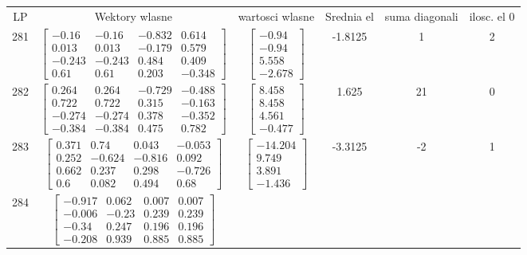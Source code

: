 \documentclass[a4paper,12pt]{article}
\begin{document}
\bgroup {} \vspace{0.2in} \begin{tabular}{c c c c c c}
LP &Wektory wlasne & wartosci wlasne & Srednia el & suma diagonali & ilosc. el 0\\
281
&
$\begin{bmatrix} -0.16 & -0.16 & -0.832 & 0.614 \\ 0.013 & 0.013 & -0.179 & 0.579 \\ -0.243 & -0.243 & 0.484 & 0.409 \\ 0.61 & 0.61 & 0.203 & -0.348 \end{bmatrix}$
&
$\begin{bmatrix} -0.94 \\ -0.94 \\ 5.558 \\ -2.678 \end{bmatrix}$
&
-1.8125
&
1
&
2
\\
282
&
$\begin{bmatrix} 0.264 & 0.264 & -0.729 & -0.488 \\ 0.722 & 0.722 & 0.315 & -0.163 \\ -0.274 & -0.274 & 0.378 & -0.352 \\ -0.384 & -0.384 & 0.475 & 0.782 \end{bmatrix}$
&
$\begin{bmatrix} 8.458 \\ 8.458 \\ 4.561 \\ -0.477 \end{bmatrix}$
&
1.625
&
21
&
0
\\
283
&
$\begin{bmatrix} 0.371 & 0.74 & 0.043 & -0.053 \\ 0.252 & -0.624 & -0.816 & 0.092 \\ 0.662 & 0.237 & 0.298 & -0.726 \\ 0.6 & 0.082 & 0.494 & 0.68 \end{bmatrix}$
&
$\begin{bmatrix} -14.204 \\ 9.749 \\ 3.891 \\ -1.436 \end{bmatrix}$
&
-3.3125
&
-2
&
1
\\
284
&
$\begin{bmatrix} -0.917 & 0.062 & 0.007 & 0.007 \\ -0.006 & -0.23 & 0.239 & 0.239 \\ -0.34 & 0.247 & 0.196 & 0.196 \\ -0.208 & 0.939 & 0.885 & 0.885 \end{bmatrix}$

\end{tabular}
\end{document}
